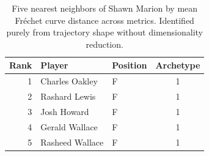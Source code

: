 \begin{table}[htbp]
  \centering\small
  \begin{tabular}{rllc}
    \toprule
    Rank & Player & Position & Archetype \\
    \midrule
    1 & Charles Oakley & F & 1 \\
    2 & Rashard Lewis & F & 1 \\
    3 & Josh Howard & F & 1 \\
    4 & Gerald Wallace & F & 1 \\
    5 & Rasheed Wallace & F & 1 \\
    \bottomrule
  \end{tabular}
  \caption{Five nearest neighbors of Shawn Marion by mean Fr\'{e}chet curve distance across metrics. Identified purely from trajectory shape without dimensionality reduction.}
  \label{tab:Shawn_Marion_frechet_curve_neighbors}
\end{table}

